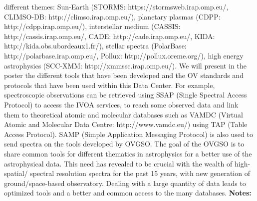 \documentclass{report}
\begin{document}
{{{{{{{{{{{{{{{{{{{{{{{{{{{{{{{{{{{{{{{{{{{{{{{{{{{{{{{{{{{{{{{{{{{{{{{{{{{{{{{{{{{{{{{{{{{{{{{{{{{{{{{{{{{{{{{{{{{{{{{{{{{{{{{{{{{{{{{{{{{{{{{{{{{{{{{{{{{{{{{{different themes: Sun-Earth (STORMS: https://stormsweb.irap.omp.eu/, CLIMSO-DB: http://climso.irap.omp.eu/), planetary plasmas (CDPP: http://cdpp.irap.omp.eu/), interstellar medium (CASSIS: http://cassis.irap.omp.eu/, CADE: http://cade.irap.omp.eu/, KIDA: http://kida.obs.ubordeaux1.fr/), stellar spectra (PolarBase: http://polarbase.irap.omp.eu/, Pollux: http://pollux.oreme.org/), high energy astrophysics (SCC-XMM: http://xmmssc.irap.omp.eu/). We will present in the poster the different tools that have been developed and the OV standards and protocols that have been used within this Data Center. For example, spectroscopic observations can be retrieved using SSAP (Single Spectral Access Protocol) to access the IVOA services, to reach some observed data and link them to theoretical atomic and molecular databases such as VAMDC (Virtual Atomic and Molecular Data Centre: http://www.vamdc.eu/) using TAP (Table Access Protocol).
SAMP (Simple Application Messaging Protocol) is also used to send spectra on the tools developed by OVGSO.
The goal of the OVGSO is to share common tools for different thematics in astrophysics for a better use of the astrophysical data. This need has revealed to be crucial with the wealth of high-spatial/
spectral resolution spectra for the past 15 years, with new generation of ground/space-based observatory. Dealing with a large quantity of data leads to optimized tools and a better and common access to the many databases.\newline
{\bf Notes:}\newline
{\newpage
}}}}}}}}}}}}}}}}}}}}}}}}}}}}}}}}}}}}}}}}}}}}}}}}}}}}}}}}}}}}}}}}}}}}}}}}}}}}}}}}}}}}}}}}}}}}}}}}}}}}}}}}}}}}}}}}}}}}}}}}}}}}}}}}}}}}}}}}}}}}}}}}}}}}}}}}}}}}}}}}}
\end{document}

